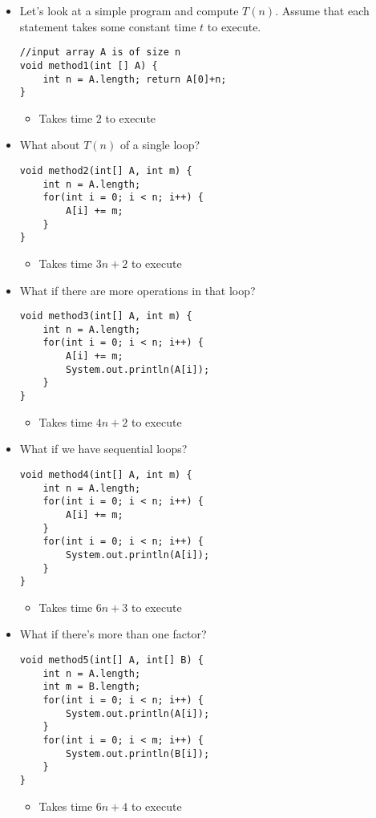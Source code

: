 \documentclass[10pt]{article}
\begin{document}
\begin{itemize}
\item Let's look at a simple program and compute $T(n)$. Assume that each statement takes some constant time $t$ to execute.
\begin{verbatim}
//input array A is of size n
void method1(int [] A) {
    int n = A.length; return A[0]+n;
}
\end{verbatim}
\begin{itemize}
    \item Takes time $2$ to execute
\end{itemize}

\item What about $T(n)$ of a single loop?
\begin{verbatim}
void method2(int[] A, int m) {
    int n = A.length;
    for(int i = 0; i < n; i++) {
        A[i] += m;
    }
}
\end{verbatim}
\begin{itemize}
    \item Takes time $3n+2$ to execute
\end{itemize}

\item What if there are more operations in that loop?
\begin{verbatim}
void method3(int[] A, int m) {
    int n = A.length;
    for(int i = 0; i < n; i++) {
        A[i] += m;
        System.out.println(A[i]);
    }
}
\end{verbatim}
\begin{itemize}
    \item Takes time $4n+2$ to execute
\end{itemize}

\item What if we have sequential loops?
\begin{verbatim}
void method4(int[] A, int m) {
    int n = A.length;
    for(int i = 0; i < n; i++) {
        A[i] += m;
    }
    for(int i = 0; i < n; i++) {
        System.out.println(A[i]);
    }
}
\end{verbatim}
\begin{itemize}
    \item Takes time $6n+3$ to execute
\end{itemize}

\item What if there's more than one factor?
\begin{verbatim}
void method5(int[] A, int[] B) { 
    int n = A.length;
    int m = B.length;
    for(int i = 0; i < n; i++) {
        System.out.println(A[i]);
    }
    for(int i = 0; i < m; i++) {
        System.out.println(B[i]);
    }
}
\end{verbatim}
\begin{itemize}
    \item Takes time $6n+4$ to execute
\end{itemize}


\end{itemize}
\end{document}
